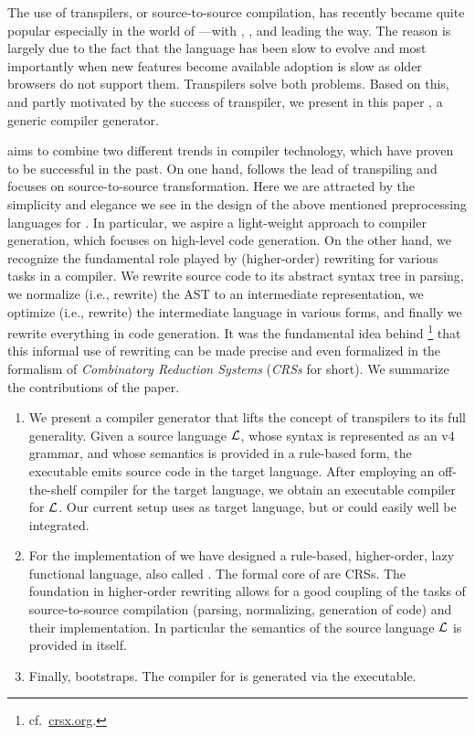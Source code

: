 %
The use of transpilers, or source-to-source compilation, has recently
became quite popular especially in the world of \javascript---with
\coffeescript, \babel, and \typescript leading the way.  The reason is
largely due to the fact that the \javascript language has been slow to
evolve and most importantly when new features become available
adoption is slow as older browsers do not support them. Transpilers
solve both problems.
%
Based on this, and partly motivated by the success of transpiler, we
present in this paper \Tosca, a generic compiler generator.

\Tosca aims to combine two different trends in compiler
technology, which have proven to be successful in the past.
%
On one hand, \Tosca follows the lead of transpiling and focuses
on source-to-source transformation. Here we are attracted by the
simplicity and elegance we see in the design of the above mentioned
preprocessing languages for \javascript. In particular, we aspire a
light-weight approach to compiler generation, which focuses on
high-level code generation.
%
On the other hand, we recognize the fundamental role played by
(higher-order) rewriting for various tasks in a compiler. We rewrite
source code to its abstract syntax tree in parsing, we normalize
(i.e., rewrite) the AST to an intermediate representation, we optimize
(i.e., rewrite) the intermediate language in various forms, and
finally we rewrite everything in code generation. It was the
fundamental idea behind \crsx%
\footnote{cf.~\href{http://crsx.org/}{crsx.org}.}  that this informal
use of rewriting can be made precise and even formalized in the
formalism of \emph{Combinatory Reduction Systems} (\emph{CRSs} for
short).
%
We summarize the contributions of the paper.
%
\begin{enumerate}
\item We present a compiler generator that lifts the concept of
  transpilers to its full generality. Given a source language $\mathcal{L}$,
  whose syntax is represented as an \antlr v4 grammar, and whose
  semantics is provided in a rule-based form, the \Tosca
  executable emits source code in the target language. After employing
  an off-the-shelf compiler for the target language, we obtain an
  executable compiler for $\mathcal{L}$. Our current setup uses  as
  target language, but \cpp or \haskell could easily well be
  integrated.

\item For the implementation of \Tosca we have designed a rule-based,
  higher-order, lazy functional language, also called \Tosca.  The
  formal core of \Tosca are CRSs. The foundation in higher-order
  rewriting allows for a good coupling of the tasks of
  source-to-source compilation (parsing, normalizing, generation of
  code) and their implementation. In particular the semantics of the
  source language $\mathcal{L}$ is provided in \Tosca itself.

\item Finally, \Tosca bootstraps. The compiler for \Tosca
  is generated via the \Tosca executable.
\end{enumerate}


